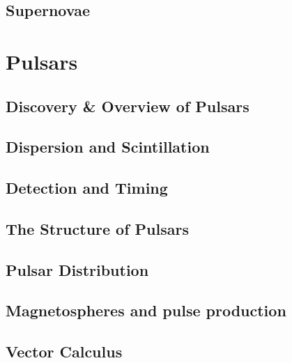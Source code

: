 \documentclass{momento}
\begin{document}


\chapter{Supernovae}
\label{cha:supernovae}



\part{Pulsars}
\label{part:pulsars}

\chapter{Discovery \& Overview of Pulsars}
\label{cha:discovery--overview}


\chapter{Dispersion and Scintillation}
\label{cha:disp-scint}


\chapter{Detection and Timing}
\label{cha:detection-timing}


\chapter{The Structure of Pulsars}
\label{cha:structure-pulsars}



\chapter{Pulsar Distribution}
\label{cha:pulsar-distribution}


\chapter{Magnetospheres and pulse production}
\label{cha:magn-pulse-prod}


\appendices

\chapter{Vector Calculus}
\label{cha:vector-calculus}






\nocite{*}
\end{document}
